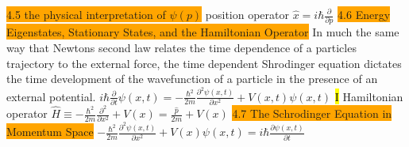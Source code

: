 \documentclass[fontsize=4pt]{scrartcl}
\begin{document}
\colorbox{Orange}{4.5 the physical interpretation of $\psi(p)$}
position operator
$\hat{x} = i \hbar \frac{\partial}{\partial p}$ 
\colorbox{Orange}{4.6 Energy Eigenstates, Stationary States, and the Hamiltonian Operator}
In much the same way that Newtons second law relates the time dependence of a particles trajectory to the external force, the time dependent Shrodinger equation dictates the time development of the wavefunction of a particle in the presence of an external potential.
$i\hbar \frac{\partial}{\partial t}\psi(x,t) = -\frac{\hbar^2}{2m}\frac{\partial^2 \psi(x,t)}{\partial x^2} + V(x,t) \psi(x,t)$
\hl{I}
Hamiltonian operator $\hat{H} \equiv -\frac{\hbar^2}{2m}\frac{\partial^2}{\partial x^2} + V(x) = \frac{\hat{p}}{2m} + V(x)$
\colorbox{Orange}{4.7 The Schrodinger Equation in Momentum Space}
$-\frac{\hbar^2}{2m}\frac{\partial^2 \psi(x,t)}{\partial x^2} + V(x)\psi(x,t) = i\hbar \frac{\partial \psi (x,t)}{\partial t}$
\end{document}
